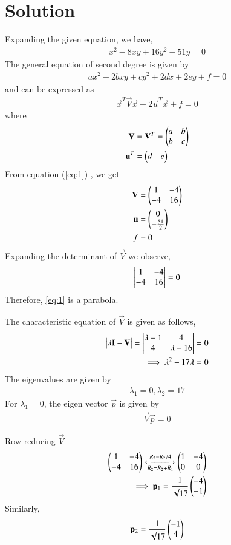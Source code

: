 \documentclass[journal,12pt,twocolumn]{IEEEtran}
\begin{document}
\section{Solution}
Expanding the given equation, we have,
\begin{align}
    x^2 -8xy +16y^2 -51y =0 \label{eq:1}
\end{align}
The general equation of second degree is given by
\begin{align}
	ax^2+2bxy+cy^2+2dx+2ey+f=0 \label{gen_eq}
\end{align}
and can be expressed as
\begin{align}
	\vec{x}^T\vec{V}\vec{x}+2\vec{u}^T\vec{x}+f=0 \label{conic_eq}
\end{align}
where
\begin{align}
	\mathbf{V} &= \mathbf{V}^T = \begin{pmatrix}a & b \\ b & c\end{pmatrix}
	\\
	\mathbf{u}^T &= \begin{pmatrix}d & e\end{pmatrix}
\end{align}
From equation (\ref{eq:1}) , we get
\begin{align}
	\mathbf{V} &= \begin{pmatrix}1 & -4\\-4 & 16\end{pmatrix}\label{eq:2}\\
	\mathbf{u} &= \begin{pmatrix}0\\-\frac{51}{2}\end{pmatrix}\label{eq:3}\\ 
	f &= 0 \label{eq:4}
\end{align}
Expanding the determinant of $\vec{V}$ we observe, 
\begin{align}
	\begin{vmatrix}1 & -4\\-4 & 16\end{vmatrix} = 0 \label{eq:4}
\end{align}
Therefore, \ref{eq:1} is a parabola.

The characteristic equation of $\vec{V}$ is given as follows,
\begin{align}
		\begin{vmatrix}\lambda\mathbf{I}-\mathbf{V}\end{vmatrix} = \begin{vmatrix}\lambda-1&4\\ 4&\lambda-16\end{vmatrix} &= 0\\
		\implies \lambda^2-17\lambda &= 0\label{eq:5}
\end{align}
The eigenvalues are given by
\begin{align}
		\lambda_1=0, \lambda_2=17\label{eq:6}    
\end{align}
For $\lambda_1 = 0$, the eigen vector $\vec{p}$ is given by 
\begin{align}
		\vec{V}\vec{p} = 0
\end{align}

Row reducing $\vec{V}$ 
\begin{align}
		\begin{pmatrix}1&-4\\-4&16\end{pmatrix}\xleftrightarrow[R_2=R_2+R_1]{R_2=R_2/4}\begin{pmatrix}1&-4\\0&0\end{pmatrix}\\
		\implies\mathbf{p}_1=\frac{1}{\sqrt{17}}\begin{pmatrix}-4\\-1\end{pmatrix} \label{eq:7}
\end{align}
Similarly, 
\begin{align}
		\mathbf{p}_2=\frac{1}{\sqrt{17}}\begin{pmatrix}-1\\4\end{pmatrix} \label{eq:8}
\end{align}
\end{document}
